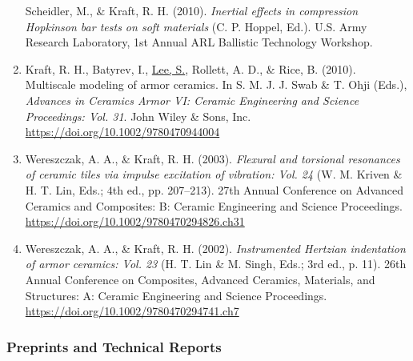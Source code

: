 \documentclass[11pt]{article}
\begin{document}
\begin{enumerate}
  Scheidler, M., \& Kraft, R. 
H. 
(2010). 
\emph{Inertial effects in
  compression Hopkinson bar tests on soft materials} (C. 
P. 
Hoppel,
  Ed.). 
U.S. 
Army Research Laboratory, 1st Annual ARL Ballistic
  Technology Workshop.
\item
  Kraft, R. 
H., Batyrev, I., \underline{Lee, S.}, Rollett, A. 
D., \& Rice, B.
  (2010). 
Multiscale modeling of armor ceramics. 
In S. 
M. 
J. 
J. 
Swab \&
  T. 
Ohji (Eds.), \emph{Advances in Ceramics Armor VI: Ceramic
  Engineering and Science Proceedings: Vol. 
31}. 
John Wiley \& Sons,
  Inc. 
\url{https://doi.org/10.1002/9780470944004}
\item
  Wereszczak, A. 
A., \& Kraft, R. 
H. 
(2003). 
\emph{Flexural and
  torsional resonances of ceramic tiles via impulse excitation of
  vibration: Vol. 
24} (W. 
M. 
Kriven \& H. 
T. 
Lin, Eds.; 4th ed., pp.
  207--213). 
27th Annual Conference on Advanced Ceramics and Composites:
  B: Ceramic Engineering and Science Proceedings.
  \url{https://doi.org/10.1002/9780470294826.ch31}
\item
  Wereszczak, A. 
A., \& Kraft, R. 
H. 
(2002). 
\emph{Instrumented Hertzian
  indentation of armor ceramics: Vol. 
23} (H. 
T. 
Lin \& M. 
Singh, Eds.;
  3rd ed., p. 
11). 
26th Annual Conference on Composites, Advanced
  Ceramics, Materials, and Structures: A: Ceramic Engineering and
  Science Proceedings. 
\url{https://doi.org/10.1002/9780470294741.ch7}
\end{enumerate}

\subsubsection{Preprints and Technical Reports}\label{other}
\end{document}
